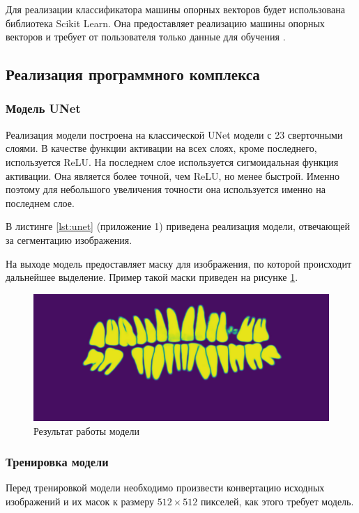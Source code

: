 Для реализации классификатора машины опорных векторов будет использована библиотека Scikit Learn. Она предоставляет реализацию машины опорных векторов и требует от пользователя только данные для обучения \cite{scikitsvm}.

\subsection{Реализация программного комплекса}

\subsubsection{Модель UNet}

Реализация модели построена на классической UNet модели с 23 сверточными слоями. В качестве функции активации на всех слоях, кроме последнего, используется ReLU. На последнем слое используется сигмоидальная функция активации. Она является более точной, чем ReLU, но менее быстрой. Именно поэтому для небольшого увеличения точности она используется именно на последнем слое.

В листинге \ref{lst:unet} (приложение 1) приведена реализация модели, отвечающей за сегментацию изображения.

На выходе модель предоставляет маску для изображения, по которой происходит дальнейшее выделение. Пример такой маски приведен на рисунке \ref{fig:mask}.

\begin{figure}[H]
	\centering
	\includegraphics[width=\textwidth]{img/mask.png}
	\caption{Результат работы модели}
	\label{fig:mask}
\end{figure}

\subsubsection{Тренировка модели}

Перед тренировкой модели необходимо произвести конвертацию исходных изображений и их масок к размеру $512 \times 512$ пикселей, как этого требует модель.


